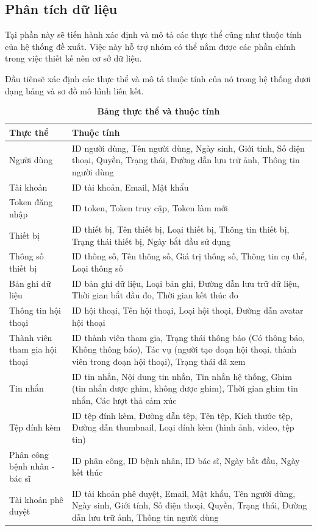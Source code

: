 \subsection{Phân tích dữ liệu}

Tại phần này sẽ tiến hành xác định và mô tả các thực thể cũng như
 thuộc tính của hệ thống đề xuất. Việc này hỗ trợ nhóm có thể nắm được các phần chính 
 trong việc thiết kế nên cơ sở dữ liệu.

     Đầu tiênsẽ xác định các thực thể và mô tả thuộc tính của nó trong hệ
      thống dươi dạng bảng và sơ đồ mô hình liên kết. 

  \begin{xltabular}{\textwidth}{
  | >{\raggedright\arraybackslash}p{4.5cm}
  | >{\raggedright\arraybackslash}X |
  }
  \caption{\bfseries \fontsize{12pt}{0pt}\selectfont Bảng thực thể và thuộc tính}
  \\
  \hline
  \bfseries Thực thể    &\bfseries Thuộc tính   \\ \hline
  Người dùng & 
  ID người dùng, Tên người dùng, Ngày sinh, Giới tính, Số điện thoại, Quyền, Trạng thái, Đường dẫn lưu trữ ảnh, Thông tin người dùng \\
  \hline
  Tài khoản &
  ID tài khoản, Email, Mật khẩu  \\
  \hline
  Token đăng nhập &
  ID token, Token truy cập, Token làm mới \\
  \hline
  Thiết bị & 
  ID thiết bị, Tên thiết bị, Loại thiết bị, Thông tin thiết bị, Trạng thái thiết bị, Ngày bắt đầu sử dụng\\
  \hline
  Thông số thiết bị &
  ID thông số, Tên thông số, Giá trị thông số, Thông tin cụ thể, Loại thông số \\
  \hline
  Bản ghi dữ liệu & 
  ID bản ghi dữ liệu, Loại bản ghi, Đường dẫn lưu trữ dữ liệu, Thời gian bắt đầu đo, Thời gian kết thúc đo \\
  \hline
  Thông tin hội thoại &
  ID hội thoại, Tên hội thoại, Loại hội thoại, Đường dẫn avatar hội thoại \\
  \hline
  Thành viên tham gia hội thoại &
  ID thành viên tham gia, Trạng thái thông báo (Có thông báo, Không thông báo), Tác vụ (người tạo đoạn hội thoại, thành viên trong đoạn hội thoại), Trạng thái đã xem\\
  \hline
  Tin nhắn & 
  ID tin nhắn, Nội dung tin nhắn, Tin nhắn hệ thống, Ghim (tin nhắn được ghim, không được ghim), Thời gian ghim tin nhắn, Các lượt thả cảm xúc \\
  \hline
  Tệp đính kèm &
  ID tệp đính kèm, Đường dẫn tệp, Tên tệp, Kích thước tệp, Đường dẫn thumbnail, Loại đính kèm (hình ảnh, video, tệp tin) \\
  \hline 
  Phân công bệnh nhân - bác sĩ & 
  ID phân công, ID bệnh nhân, ID bác sĩ, Ngày bắt đầu, Ngày kết thúc \\
  \hline 
  Tài khoản phê duyệt & 
  ID tài khoản phê duyệt, Email, Mật khẩu, Tên người dùng, Ngày sinh, Giới tính, Số điện thoại, Quyền, Trạng thái, Đường dẫn lưu trữ ảnh, Thông tin người dùng
  \\ \hline
  \end{xltabular}


